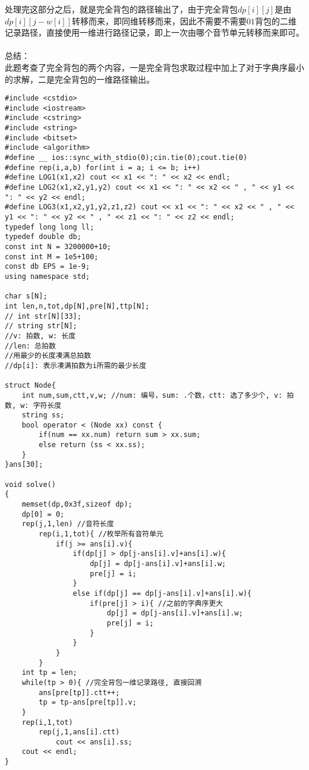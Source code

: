 \documentclass[twoside]{article}
\begin{document}
处理完这部分之后，就是完全背包的路径输出了，由于完全背包$dp[i][j]$是由$dp[i][j-w[i]]$转移而来，即同维转移而来，因此不需要不需要$01$背包的二维记录路径，直接使用一维进行路径记录，即上一次由哪个音节单元转移而来即可。\\
\\
总结：\\
此题考查了完全背包的两个内容，一是完全背包求取过程中加上了对于字典序最小的求解，二是完全背包的一维路径输出。\\
\begin{lstlisting}
#include <cstdio>
#include <iostream>
#include <cstring>
#include <string>
#include <bitset>
#include <algorithm>
#define __ ios::sync_with_stdio(0);cin.tie(0);cout.tie(0)
#define rep(i,a,b) for(int i = a; i <= b; i++)
#define LOG1(x1,x2) cout << x1 << ": " << x2 << endl;
#define LOG2(x1,x2,y1,y2) cout << x1 << ": " << x2 << " , " << y1 << ": " << y2 << endl;
#define LOG3(x1,x2,y1,y2,z1,z2) cout << x1 << ": " << x2 << " , " << y1 << ": " << y2 << " , " << z1 << ": " << z2 << endl;
typedef long long ll;
typedef double db;
const int N = 3200000+10;
const int M = 1e5+100;
const db EPS = 1e-9;
using namespace std;

char s[N];
int len,n,tot,dp[N],pre[N],ttp[N];
// int str[N][33];
// string str[N];
//v: 拍数, w: 长度
//len: 总拍数
//用最少的长度凑满总拍数
//dp[i]: 表示凑满拍数为i所需的最少长度

struct Node{
	int num,sum,ctt,v,w; //num: 编号，sum: .个数，ctt: 选了多少个, v: 拍数, w: 字符长度
	string ss;
	bool operator < (Node xx) const {
		if(num == xx.num) return sum > xx.sum; 
		else return (ss < xx.ss);
	}
}ans[30];

void solve()
{
	memset(dp,0x3f,sizeof dp);
	dp[0] = 0;
	rep(j,1,len) //音符长度
		rep(i,1,tot){ //枚举所有音符单元
			if(j >= ans[i].v){
				if(dp[j] > dp[j-ans[i].v]+ans[i].w){
					dp[j] = dp[j-ans[i].v]+ans[i].w;
					pre[j] = i;
				}
				else if(dp[j] == dp[j-ans[i].v]+ans[i].w){
					if(pre[j] > i){ //之前的字典序更大
						dp[j] = dp[j-ans[i].v]+ans[i].w;
						pre[j] = i;		
					}
				}
			}
		}
	int tp = len;
	while(tp > 0){ //完全背包一维记录路径, 直接回溯
		ans[pre[tp]].ctt++;
		tp = tp-ans[pre[tp]].v;
	}
	rep(i,1,tot)
		rep(j,1,ans[i].ctt)
			cout << ans[i].ss;
	cout << endl;
}


\end{lstlisting}
\end{document}
